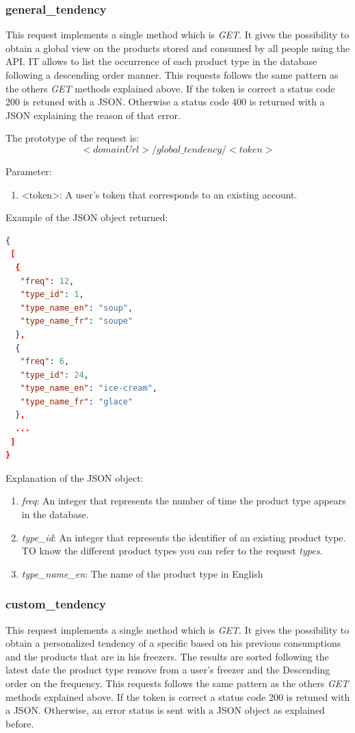 \subsubsection{general\_tendency}
This request implements a single method which is \textit{GET}. It gives the possibility to obtain a global view on the products stored and consumed by all people using the API. IT allows to list the occurrence of each product type in the database following a descending order manner. This requests follows the same pattern as the others \textit{GET} methods explained above. If the token is correct a status code 200 is retuned with a JSON. Otherwise a status code 400 is returned with a JSON explaining the reason of that error.

The prototype of the request is:
$$<domainUrl>/global\_tendency/<token>$$

Parameter:
\begin{enumerate}
\item <token>: A user's token that corresponds to an existing account.
\end{enumerate}

Example of the JSON object returned:
\begin{lstlisting}[language=json]
{
 [
  {
   "freq": 12,
   "type_id": 1,
   "type_name_en": "soup",
   "type_name_fr": "soupe"
  },
  {
   "freq": 6,
   "type_id": 24,
   "type_name_en": "ice-cream",
   "type_name_fr": "glace"
  },
  ...
 ]
}
\end{lstlisting}

Explanation of the  JSON object:
\begin{enumerate}
\item \textit{freq}: An integer that represents the number of time the product type appears in the database.
\item \textit{type\_id}: An integer that represents the identifier of an existing product type. TO know the different product types you can refer to the request \textit{types}.
\item \textit{type\_name\_en}: The name of the product type in English
\end{enumerate}

\subsubsection{custom\_tendency}
This request implements a single method which is \textit{GET}. It gives the possibility to obtain a personalized tendency of a specific based on his previous consumptions and the products that are in his freezers. The results are sorted following the latest date the product type remove from a user's freezer and the Descending order on the frequency. This requests follows the same pattern as the others \textit{GET} methods explained above. If the token is correct a status code 200 is retuned with a JSON. Otherwise, an error status is sent with a JSON object as explained before.\\

